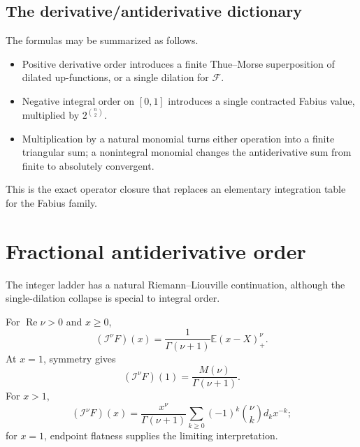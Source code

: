 \documentclass[11pt,oneside]{article}
\theoremstyle{definition}
\theoremstyle{remark}
\newcommand{\Fs}{\mathcal F}
\newcommand{\E}{\mathbb E}
\newcommand{\RL}{\mathcal I}
\newcommand{\1}{\mathbf 1}
\DeclareMathOperator{\Rea}{Re}
\begin{document}
\subsection{The derivative/antiderivative dictionary}
The formulas may be summarized as follows.
\begin{itemize}
\item Positive derivative order introduces a finite Thue--Morse superposition
      of dilated up-functions, or a single dilation for \(\Fs\).
\item Negative integral order on \([0,1]\) introduces a single contracted
      Fabius value, multiplied by \(2^{\binom n2}\).
\item Multiplication by a natural monomial turns either operation into a finite
      triangular sum; a nonintegral monomial changes the antiderivative sum
      from finite to absolutely convergent.
\end{itemize}
This is the exact operator closure that replaces an elementary integration
table for the Fabius family.

\section{Fractional antiderivative order}

The integer ladder has a natural Riemann--Liouville continuation, although the
single-dilation collapse is special to integral order.

\begin{proposition}\label{p1:prop:fractional-F}
For \(\Rea\nu>0\) and \(x\geq0\),
\begin{equation}
 \boxed{\quad
 (\RL^\nu F)(x)=\frac1{\Gamma(\nu+1)}\E (x-X)_+^\nu.
 \quad}                                                        \label{p1:eq:fractional-stoploss}
\end{equation}
At \(x=1\), symmetry gives
\begin{equation}
 (\RL^\nu F)(1)=\frac{M(\nu)}{\Gamma(\nu+1)}.                  \label{p1:eq:fractional-one}
\end{equation}
For \(x>1\),
\begin{equation}
 (\RL^\nu F)(x)=\frac{x^\nu}{\Gamma(\nu+1)}
 \sum_{k\geq0}(-1)^k\binom\nu k d_kx^{-k};                    \label{p1:eq:fractional-exterior}
\end{equation}
for \(x=1\), endpoint flatness supplies the limiting interpretation.
\end{proposition}
\end{document}
